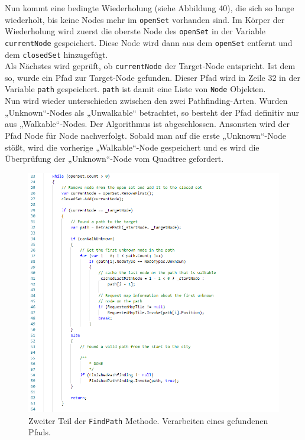\documentclass[a4paper,12pt]{article}
\newcommand{\code}{\texttt}
\begin{document}
Nun kommt eine bedingte Wiederholung (siehe Abbildung 40), die sich so lange wiederholt, bis keine Nodes mehr im \code{openSet} vorhanden sind.
Im Körper der Wiederholung wird zuerst die oberste Node des \code{openSet} in der Variable \code{currentNode} gespeichert. Diese Node wird dann aus dem \code{openSet} entfernt und dem \code{closedSet} hinzugefügt.
\\[0.4cm]
Als Nächstes wird geprüft, ob \code{currentNode} der Target-Node entspricht. Ist dem so, wurde ein Pfad zur Target-Node gefunden. Dieser Pfad wird in Zeile 32 in der Variable \code{path} gespeichert. \code{path} ist damit eine Liste von \code{Node} Objekten.
\\[0.4cm]
Nun wird wieder unterschieden zwischen den zwei Pathfinding-Arten. Wurden „Unknown“-Nodes als „Unwalkable“ betrachtet, so besteht der Pfad definitiv nur aus „Walkable“-Nodes. Der Algorithmus ist abgeschlossen. Ansonsten wird der Pfad Node für Node nachverfolgt. Sobald man auf die erste „Unknown“-Node stößt, wird die vorherige „Walkable“-Node gespeichert und es wird die Überprüfung der „Unknown“-Node vom Quadtree gefordert.
\begin{figure}[H]
    \centering
    \includegraphics[width=1\linewidth]{Bilder/Aufgabe3/Teilaufgabe_C/Pathfinding_02.png}
    \caption{Zweiter Teil der \code{FindPath} Methode. Verarbeiten eines gefundenen Pfads.}
\end{figure}
\end{document}
